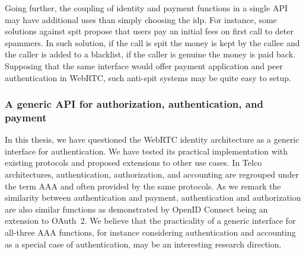 Going further, the coupling of identity and payment functions in a single API may have additional uses than simply choosing the \gls{idp}.
For instance, some solutions against \gls{spit} propose that users pay an initial fees on first call to deter spammers.
In such solution, if the call is \gls{spit} the money is kept by the callee and the caller is added to a blacklist, if the caller is genuine the money is paid back. 
Supposing that the same interface would offer payment application and peer authentication in WebRTC, such anti-\gls{spit} systems may be quite easy to setup. 

\subsubsection{A generic API for authorization, authentication, and payment}
In this thesis, we have questioned the WebRTC identity architecture as a generic interface for authentication.
We have tested its practical implementation with existing protocols and proposed extensions to other use cases.
In Telco architectures, authentication, authorization, and accounting are regrouped under the term AAA and often provided by the same protocols.
As we remark the similarity between authentication and payment, authentication and authorization are also similar functions as demonstrated by OpenID Connect being an extension to OAuth~2.
We believe that the practicality of a generic interface for all-three AAA functions, for instance considering authentication and accounting as a special case of authentication, may be an interesting research direction.